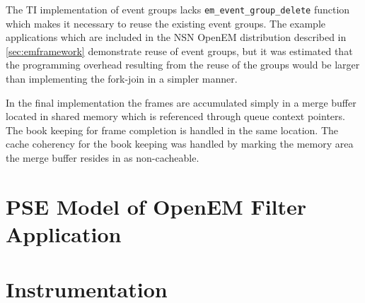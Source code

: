 The TI implementation of event groups lacks \texttt{em\_event\_group\_delete}
function which makes it necessary to reuse the existing event groups. The
example applications which are included in the NSN OpenEM distribution
described in \ref{sec:emframework} demonstrate reuse of event groups, but it
was estimated that the programming overhead resulting from the reuse of the
groups would be larger than implementing the fork-join in a simpler manner.

In the final implementation the frames are accumulated simply in a merge buffer
located in shared memory which is referenced through queue context pointers. The
book keeping for frame completion is handled in the same location. The cache
coherency for the book keeping was handled by marking the memory area the merge
buffer resides in as non-cacheable.

\section{PSE Model of OpenEM Filter Application}
\section{Instrumentation}

